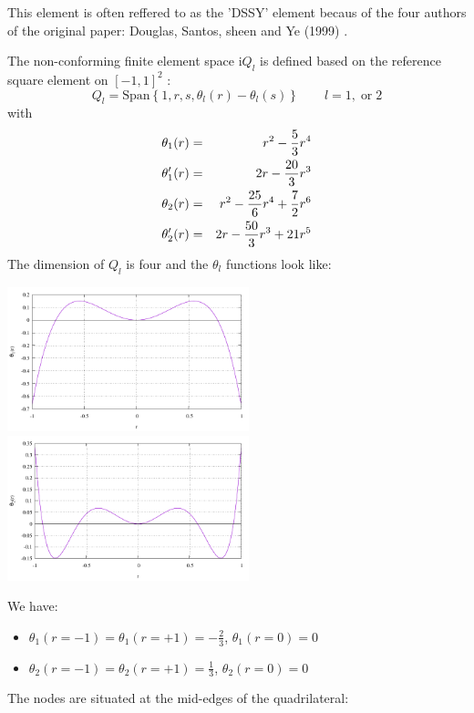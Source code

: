 This element is often reffered to as the 'DSSY' element becaus of the 
four authors of the original paper: Douglas, Santos, sheen and Ye (1999) \cite{doss99}.

The non-conforming finite element space i$Q_l$ is defined based on the 
reference square element on $[-1,1]^2$ :
\[
Q_l = \text{Span} \left\{ 1, r, s, \theta_l(r)-\theta_l(s)  \right\}
\qquad l=1,\; \text{or} \; 2
\]
with
\begin{eqnarray}
\theta_1(r)  &=& r^2-\frac53r^4  \nonumber\\
\theta_1'(r) &=& 2r-\frac{20}{3}r^3  \nonumber\\
\theta_2(r)  &=& r^2-\frac{25}{6} r^4 + \frac72 r^6 \\ 
\theta_2'(r) &=& 2r-\frac{50}{3} r^3 + 21 r^5
\end{eqnarray}
The dimension of $Q_l$ is four and the $\theta_l$ functions look like:
\begin{center}
\includegraphics[width=7cm]{images/dssy/theta1}
\includegraphics[width=7cm]{images/dssy/theta2}
\end{center}
We have:
\begin{itemize}
\item $\theta_1(r=-1)=\theta_1(r=+1)=-\frac23$, $\theta_1(r=0)=0$ 
\item $\theta_2(r=-1)=\theta_2(r=+1)=\frac13$, $\theta_2(r=0)=0$ 
\end{itemize}
The nodes are situated at the mid-edges of the quadrilateral:



